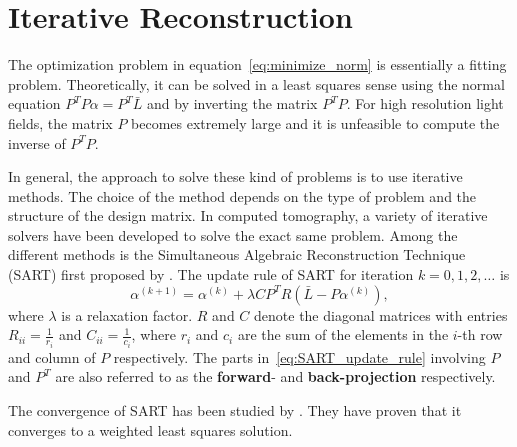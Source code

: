 \section{Iterative Reconstruction}


The optimization problem in equation~\ref{eq:minimize_norm} is essentially a fitting problem.
Theoretically, it can be solved in a least squares sense using the normal equation $P^T P \alpha = P^T \bar{L}$ and by inverting the matrix $P^T P$.
For high resolution light fields, the matrix $P$ becomes extremely large and it is unfeasible to compute the inverse of $P^T P$.

In general, the approach to solve these kind of problems is to use iterative methods.
The choice of the method depends on the type of problem and the structure of the design matrix.
In computed tomography, a variety of iterative solvers have been developed to solve the exact same problem. 
Among the different methods is the Simultaneous Algebraic Reconstruction Technique (\mbox{SART}) first proposed by \cite{SART}.
The update rule of \mbox{SART} for iteration $k = 0, 1, 2, \dots$ is
\begin{equation}\label{eq:SART_update_rule}
\alpha^{(k + 1)} = \alpha^{(k)} + \lambda C P^T R \left( \bar{L} - P \alpha^{(k)} \right), 	
\end{equation}
where $\lambda$ is a relaxation factor.
$R$ and $C$ denote the diagonal matrices with entries $R_{ii} = \frac{1}{r_i}$ and $C_{ii} = \frac{1}{c_i}$, where $r_i$ and $c_i$ are the sum of the elements in the \mbox{$i$-th} row and column of $P$ respectively.
The parts in~\ref{eq:SART_update_rule} involving $P$ and $P^T$ are also referred to as the \textbf{forward}- and \textbf{back-projection} respectively.

The convergence of \mbox{SART} has been studied by \cite{ConvergenceSART2}.
They have proven that it converges to a weighted least squares solution.